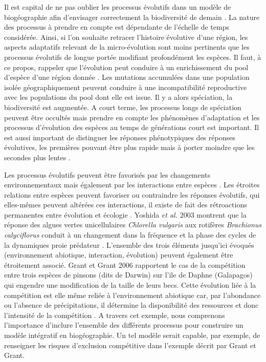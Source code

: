 Il est capital de ne pas oublier les processus évolutifs dans un modèle
de biogéographie afin d'envisager correctement la biodiversité de demain
\cite{Sexton2009,Lavergne2010}. La nature des processus à prendre en
compte est dépendante de l'échelle de temps considérée. Ainsi, si l'on
souhaite retracer l'histoire évolutive d'une région, les aspects
adaptatifs relevant de la micro-évolution sont moins pertinents que les
processus évolutifs de longue portée modifiant profondément les espèces.
Il faut, à ce propos, rappeler que l'évolution peut conduire à un
enrichissement du pool d'espèce d'une région donnée
\cite{Rosindell2011,MacArthur1967}. Les mutations accumulées dans une
population isolée géographiquement peuvent conduire à une
incompatibilité reproductive avec les populations du pool dont elle est
issue. Il y a alors spéciation, la biodiversité est augmentée. A court
terme, les processus longs de spéciation peuvent être occultés mais
prendre en compte les phénomènes d'adaptation et les processus
d'évolution des espèces au temps de générations court est important. Il
est aussi important de distinguer les réponses phénotypiques des
réponses évolutives, les premières pouvant être plus rapide mais à
porter moindre que les secondes plus lentes \cite{Gienapp2008}.

Les processus évolutifs peuvent être favorisés par les changements
environnementaux mais également par les interactions entre espèces
\cite{Tingley2009}. Les étroites relations entre espèces peuvent
favoriser ou contraindre les réponses évolutifs, qui elles-mêmes peuvent
altérées ces interactions, il existe de fait des rétroactions
permanentes entre évolution et écologie \cite{Post2009}. Yoshida
\textit{et al.} 2003 montrent que la réponse des algues vertes
unicellulaires \textit{Chlorella vulgaris} aux rotifères
\textit{Brachionus calyciflorus} conduit à un changement dans la
fréquence et la phase des cycles de la dynamiques proie prédateur
\cite{Yoshida2003}. L'ensemble des trois éléments jusqu'ici évoqués
(environnement abiotique, interaction, évolution) peuvent également être
étroitement associé. Grant et Grant 2006 rapportent le cas de la
compétition entre trois espèces de pinsons (dits de Darwin) sur l'ile de
Daphne (Galapagos) qui engendre une modification de la taille de leurs
becs. Cette évolution liée à la compétition est elle même reliée à
l'environnement abiotique car, par l'abondance ou l'absence de
précipitations, il détermine la disponibilité des ressources et donc
l'intensité de la compétition \cite{Grant2006}. A travers cet exemple,
nous comprenons l'importance d'inclure l'ensemble des différents
processus pour construire un modèle intégratif en biogéographie. Un tel
modèle serait capable, par exemple, de renseigner les risques
d'exclusion compétitive dans l'exemple décrit par Grant et Grant.

